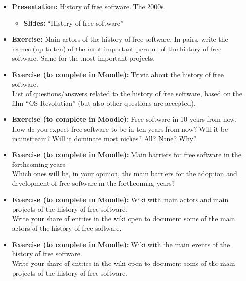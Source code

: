 \documentclass[a4paper]{article}
\begin{document}
\begin{itemize}
\item \textbf{Presentation:} History of free software. The 2000s.
  \begin{itemize}
  \item \textbf{Slides:} ``History of free software''
  \end{itemize}

\item \textbf{Exercise:} Main actors of the history of free software. In pairs, write the names (up to ten) of the most important persons of the history of free software. Same for the most important projects.

\item \textbf{Exercise (to complete in Moodle):} Trivia about the history of free software. \\
  List of questions/answers related to the history of free software, based on the film ``OS Revolution'' (but also other questions are accepted).

\item \textbf{Exercise (to complete in Moodle):} Free software in 10 years from now. \\
  How do you expect free software to be in ten years from now? Will it be mainstream? Will it dominate most niches? All? None? Why?

\item \textbf{Exercise (to complete in Moodle):} Main barriers for free software in the forthcoming years. \\
  Which ones will be, in your opinion, the main barriers for the adoption and development of free software in the forthcoming years?

\item \textbf{Exercise (to complete in Moodle):} Wiki with main actors and main projects of the history of free software. \\
  Write your share of entries in the wiki open to document some of the main actors of the history of free software.

\item \textbf{Exercise (to complete in Moodle):} Wiki with the main events of the history of free software. \\
  Write your share of entries in the wiki open to document some of the main projects of the history of free software.


\end{itemize}
\end{document}
